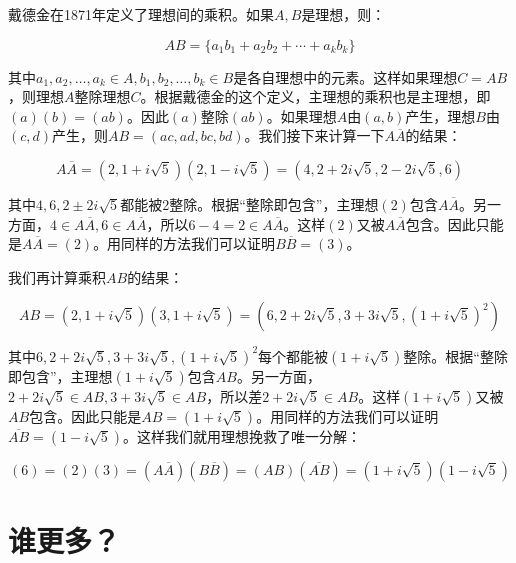 \documentclass[b5paper]{ctexart}
\begin{document}
戴德金在1871年定义了理想间的乘积。如果$A, B$是理想，则：

\[
AB = \{a_1b_1 + a_2b_2 + \dotsb + a_kb_k\}
\]

其中$a_1, a_2, \dotsc, a_k \in A, b_1, b_2, \dotsc, b_k \in B$是各自理想中的元素。这样如果理想$C = AB$，则理想$A$整除理想$C$。根据戴德金的这个定义，主理想的乘积也是主理想，即$(a)(b) = (ab)$。因此$(a)$整除$(ab)$。如果理想$A$由$(a, b)$产生，理想$B$由$(c, d)$产生，则$AB = (ac, ad, bc, bd)$。我们接下来计算一下$A\overline{A}$的结果：

\[
A\overline{A} = (2, 1 + i\sqrt{5})(2, 1 - i\sqrt{5}) = (4, 2 + 2i\sqrt{5}, 2 - 2i\sqrt{5}, 6)
\]

其中$4, 6, 2 \pm 2i\sqrt{5}$都能被2整除。根据“整除即包含”，主理想$(2)$包含$A\overline{A}$。另一方面，$4 \in A\overline{A}, 6 \in A\overline{A}$，所以$6 - 4 = 2 \in A\overline{A}$。这样$(2)$又被$A\overline{A}$包含。因此只能是$A\overline{A} = (2)$。用同样的方法我们可以证明$B\overline{B} = (3)$。

我们再计算乘积$AB$的结果：

\[
AB = (2, 1 + i\sqrt{5})(3, 1 + i\sqrt{5}) = (6, 2 + 2i\sqrt{5}, 3 + 3i\sqrt{5}, (1 + i\sqrt{5})^2)
\]

其中$6, 2 + 2i\sqrt{5}, 3 + 3i\sqrt{5}, (1 + i\sqrt{5})^2$每个都能被$(1 + i\sqrt{5})$整除。根据“整除即包含”，主理想$(1 + i\sqrt{5})$包含$AB$。另一方面，$2 + 2i\sqrt{5} \in AB, 3 + 3i\sqrt{5} \in AB$，所以差$2 + 2i\sqrt{5} \in AB$。这样$(1 + i\sqrt{5})$又被$AB$包含。因此只能是$AB = (1 + i\sqrt{5})$。用同样的方法我们可以证明$\overline{AB} = (1 - i\sqrt{5})$。这样我们就用理想挽救了唯一分解：

\[
(6) = (2)(3) = (A\overline{A})(B\overline{B}) = (AB)(\overline{AB}) = (1 + i\sqrt{5})(1 - i\sqrt{5})
\]

\section{谁更多？}
\end{document}
